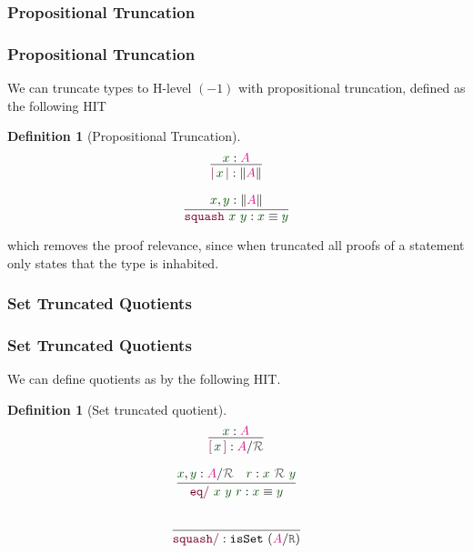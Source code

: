 \documentclass[xelatex,mathserif,serif,notheorems]{beamer} %
\theoremstyle{plain} %
\theoremstyle{definition}
\newtheorem{defn}[thm]{Definition}%
\theoremstyle{remark}
\newcommand*{\term}[1]{\textcolor{green!30!black}{#1}} %
\newcommand*{\type}[1]{\textcolor{magenta!90!black}{#1}}
\newcommand*{\relation}[1]{\textcolor{gray!75!black}{\ensuremath{\mathtt{#1}}}}
\newcommand*{\constructor}[1]{\textcolor{purple!60!black}{\ensuremath{\mathtt{#1}}}}
\newcommand*{\quotientconstructor}[1]{\constructor{[}\,#1\,\constructor{]}}
\newcommand{\setlengths}{
  \setlength{\abovedisplayskip}{4pt}
  \setlength{\belowdisplayskip}{4pt}
  \setlength{\abovedisplayshortskip}{2pt}
  \setlength{\belowdisplayshortskip}{2pt}
}
\newcommand{\startwitheq}{\vspace{-2.5mm}} %
\begin{document}
\subsubsection{Propositional Truncation}
\begin{frame}
  \frametitle{Propositional Truncation}
  We can truncate types to H-level \((-1)\) with propositional truncation, defined as the following HIT
  \begin{defn}[Propositional Truncation]\setlengths\startwitheq
    \strut
    \hfill
    \begin{minipage}[b]{0.25\linewidth}
      \begin{equation}
        \vcenter{\infer{\constructor{|}\,\term{x}\,\constructor{|} : \| \type{A} \|}{\term{x} : \type{A}}}
      \end{equation}
    \end{minipage}
    \hfill
    \begin{minipage}[b]{0.4\linewidth}
      \begin{equation}
        \vcenter{\infer{\constructor{squash}~\term{x}~\term{y} : \term{x} \equiv \term{y}}{\term{x}, \term{y} : \|\type{A}\|}}
      \end{equation}
    \end{minipage}
    \hfill
    \strut
  \end{defn}
  which removes the proof relevance, since  when truncated all proofs of a statement only states that the type is inhabited.
\end{frame}

\subsubsection{Set Truncated Quotients}
\begin{frame}
  \frametitle{Set Truncated Quotients}
  We can define quotients as by the following HIT.
  \begin{defn}[Set truncated quotient]\setlengths \startwitheq
    \strut
    \hfill
    \begin{minipage}[b]{0.25\linewidth}
      \begin{equation}
        \vcenter{\infer{\quotientconstructor{\term{x}} : \type{A} / \relation{\mathcal{R}}}{\term{x} : \type{A}}}
      \end{equation}
    \end{minipage}
    \hfill
    \begin{minipage}[b]{0.4\linewidth}
      \begin{equation}
        \vcenter{\infer{\constructor{eq/}~\term{x}~\term{y}~\term{r} : \term{x} \equiv \term{y}}{\term{x}, \term{y} : \type{A} / \relation{\mathcal{R}} & \term{r} : \term{x}~\relation{\mathcal{R}}~\term{y}}}
      \end{equation}
    \end{minipage}
    \hfill
    \strut
    \begin{equation}
      \vcenter{\infer{\constructor{squash/} :\texttt{isSet}~(\type{A} / \relation{R})}{\strut}}
    \end{equation}
  \end{defn}
\end{frame}
\end{document}
